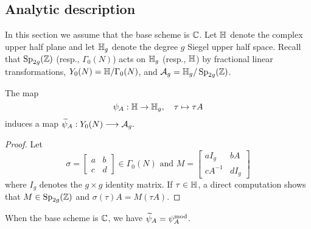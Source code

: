 \documentclass{amsart}
\begin{document}
\subsection{Analytic description}
\label{sec:ana-desc}

In this section we assume that the base scheme is $\mathbb{C}$.
Let $\mathbb{H}$ denote the complex upper half plane and let $\mathbb{H}_g$ denote the degree $g$ Siegel upper half space. Recall that $\operatorname{Sp}_{2g}(\mathbb{Z})$ (resp., $\Gamma_0(N)$) acts on $\mathbb{H}_g$ (resp., $\mathbb{H}$) by fractional linear transformations,
 $Y_0(N) = \mathbb{H}/\Gamma_0(N)$, and $\mathcal{A}_g = \mathbb{H}_g/\operatorname{Sp}_{2g}(\mathbb{Z})$.

\begin{lemma}\label{lem:psi-A-n}
The map \[
  \psi_A: \mathbb{H} \to \mathbb{H}_g, \quad  \tau \mapsto \tau A
\]
induces a map %
$
  \widetilde{\psi}_{A}: Y_0(N) \longrightarrow \mathcal{A}_g.
$
\end{lemma}

\begin{proof}
Let
\[
\sigma = \begin{bmatrix} a & b \\ c & d \end{bmatrix} \in \Gamma_0(N) \text{ and } M = \begin{bmatrix} aI_g & bA \\ cA^{-1} & dI_g \end{bmatrix}
\]
where $I_g$ denotes the $g \times g$ identity matrix.
If $\tau \in \mathbb{H}$, a direct computation shows that $M \in\operatorname{Sp}_{2g}(\mathbb{Z})$
and  $\sigma(\tau)A = M(\tau A)$.
\end{proof}


\begin{lemma}
  When the base scheme is $\mathbb{C}$, we have $\widetilde{\psi}_{A} = \psi_{A}^\mathrm{mod}$.
\end{lemma}
\end{document}
